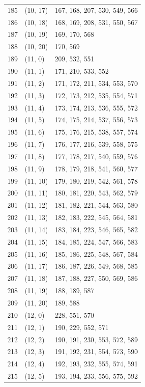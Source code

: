 \documentclass{article}
\begin{document}
\begin{longtable}{lll}
  185 & (10, 17) & 167, 168, 207, 530, 549, 566 \\
  186 & (10, 18) & 168, 169, 208, 531, 550, 567 \\
  187 & (10, 19) & 169, 170, 568 \\
  188 & (10, 20) & 170, 569 \\
  189 & (11, 0) & 209, 532, 551 \\
  190 & (11, 1) & 171, 210, 533, 552 \\
  191 & (11, 2) & 171, 172, 211, 534, 553, 570 \\
  192 & (11, 3) & 172, 173, 212, 535, 554, 571 \\
  193 & (11, 4) & 173, 174, 213, 536, 555, 572 \\
  194 & (11, 5) & 174, 175, 214, 537, 556, 573 \\
  195 & (11, 6) & 175, 176, 215, 538, 557, 574 \\
  196 & (11, 7) & 176, 177, 216, 539, 558, 575 \\
  197 & (11, 8) & 177, 178, 217, 540, 559, 576 \\
  198 & (11, 9) & 178, 179, 218, 541, 560, 577 \\
  199 & (11, 10) & 179, 180, 219, 542, 561, 578 \\
  200 & (11, 11) & 180, 181, 220, 543, 562, 579 \\
  201 & (11, 12) & 181, 182, 221, 544, 563, 580 \\
  202 & (11, 13) & 182, 183, 222, 545, 564, 581 \\
  203 & (11, 14) & 183, 184, 223, 546, 565, 582 \\
  204 & (11, 15) & 184, 185, 224, 547, 566, 583 \\
  205 & (11, 16) & 185, 186, 225, 548, 567, 584 \\
  206 & (11, 17) & 186, 187, 226, 549, 568, 585 \\
  207 & (11, 18) & 187, 188, 227, 550, 569, 586 \\
  208 & (11, 19) & 188, 189, 587 \\
  209 & (11, 20) & 189, 588 \\
  210 & (12, 0) & 228, 551, 570 \\
  211 & (12, 1) & 190, 229, 552, 571 \\
  212 & (12, 2) & 190, 191, 230, 553, 572, 589 \\
  213 & (12, 3) & 191, 192, 231, 554, 573, 590 \\
  214 & (12, 4) & 192, 193, 232, 555, 574, 591 \\
  215 & (12, 5) & 193, 194, 233, 556, 575, 592 \\

\end{longtable}
\end{document}
